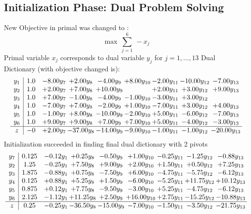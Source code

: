 \documentclass[8pt]{article}
\begin{document}
\subsection{Initialization Phase: Dual Problem Solving}
New Objective in primal was changed to : \[ \max\ \sum_{j=1}^{6}\ - x_j \] 
Primal variable $x_j$ corresponds to dual variable $y_j$ for $j = 1,\ldots,13$
Dual Dictionary (with objective changed is): 
\[\begin{array}{c| c c@{\hskip 2pt} c@{\hskip 2pt} c@{\hskip 2pt} c@{\hskip 2pt} c@{\hskip 2pt} c@{\hskip 2pt} c@{\hskip 2pt} }
 y_{1}   &  1.0 & -8.00 y_{7} & +  2.00 y_{8} & -4.00 y_{9} & +  8.00 y_{10} & -2.00 y_{11} & -10.00 y_{12} & -7.00 y_{13}\\
 y_{2}   &  1.0 & +  2.00 y_{7} & +  7.00 y_{8} & + 10.00 y_{9} &   & +  2.00 y_{11} & +  3.00 y_{12} & +  9.00 y_{13}\\
 y_{3}   &  1.0 & +  7.00 y_{7} & -1.00 y_{8} & -4.00 y_{9} & -1.00 y_{10} & -3.00 y_{11} & +  3.00 y_{12} &   \\
 y_{4}   &  1.0 & -7.00 y_{7} & +  7.00 y_{8} & -2.00 y_{9} & +  1.00 y_{10} & -7.00 y_{11} & +  3.00 y_{12} & +  4.00 y_{13}\\
 y_{5}   &  1.0 & -1.00 y_{7} & +  8.00 y_{8} & -10.00 y_{9} & -2.00 y_{10} & +  5.00 y_{11} & -6.00 y_{12} & -7.00 y_{13}\\
 y_{6}   &  1.0 & +  9.00 y_{7} & +  9.00 y_{8} & +  7.00 y_{9} & +  7.00 y_{10} & +  5.00 y_{11} & -4.00 y_{12} & -3.00 y_{13}\\
\hline
z    &  -0 & +  2.00 y_{7} & -37.00 y_{8} & -14.00 y_{9} & -9.00 y_{10} & -1.00 y_{11} & -1.00 y_{12} & -20.00 y_{13}\\
\end{array}\]
Initialization succeeded in finding final dual dictionary with 2 pivots
\[\begin{array}{c| c c@{\hskip 2pt} c@{\hskip 2pt} c@{\hskip 2pt} c@{\hskip 2pt} c@{\hskip 2pt} c@{\hskip 2pt} c@{\hskip 2pt} }
 y_{7}   &  0.125 & -0.12 y_{1} & +  0.25 y_{8} & -0.50 y_{9} & +  1.00 y_{10} & -0.25 y_{11} & -1.25 y_{12} & -0.88 y_{13}\\
 y_{2}   &  1.25 & -0.25 y_{1} & +  7.50 y_{8} & +  9.00 y_{9} & +  2.00 y_{10} & +  1.50 y_{11} & +  0.50 y_{12} & +  7.25 y_{13}\\
 y_{3}   &  1.875 & -0.88 y_{1} & +  0.75 y_{8} & -7.50 y_{9} & +  6.00 y_{10} & -4.75 y_{11} & -5.75 y_{12} & -6.12 y_{13}\\
 y_{4}   &  0.125 & +  0.88 y_{1} & +  5.25 y_{8} & +  1.50 y_{9} & -6.00 y_{10} & -5.25 y_{11} & + 11.75 y_{12} & + 10.12 y_{13}\\
 y_{5}   &  0.875 & +  0.12 y_{1} & +  7.75 y_{8} & -9.50 y_{9} & -3.00 y_{10} & +  5.25 y_{11} & -4.75 y_{12} & -6.12 y_{13}\\
 y_{6}   &  2.125 & -1.12 y_{1} & + 11.25 y_{8} & +  2.50 y_{9} & + 16.00 y_{10} & +  2.75 y_{11} & -15.25 y_{12} & -10.88 y_{13}\\
\hline
z    &  0.25 & -0.25 y_{1} & -36.50 y_{8} & -15.00 y_{9} & -7.00 y_{10} & -1.50 y_{11} & -3.50 y_{12} & -21.75 y_{13}\\
\end{array}\]
\end{document}
